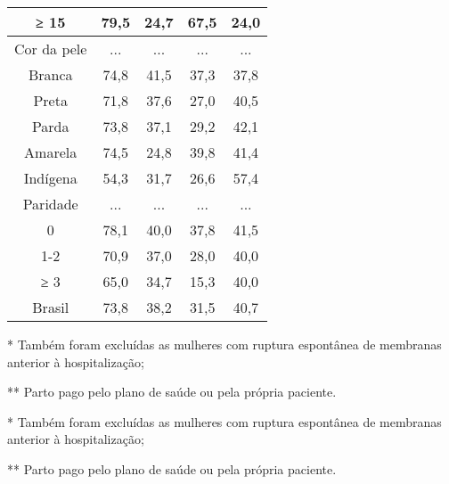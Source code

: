 \documentclass{article}
\begin{document}
\begin{table}
\begin{tabulary}{\linewidth}{ C C C C C }
≥ 15
& 79,5
& 24,7
& 67,5
& 24,0
\\ \hline

Cor da pele
& ...
& ...
& ...
& ...
\\ \hline

Branca
& 74,8
& 41,5
& 37,3
& 37,8
\\ \hline

Preta
& 71,8
& 37,6
& 27,0
& 40,5
\\ \hline

Parda
& 73,8
& 37,1
& 29,2
& 42,1
\\ \hline

Amarela
& 74,5
& 24,8
& 39,8
& 41,4
\\ \hline

Indígena
& 54,3
& 31,7
& 26,6
& 57,4
\\ \hline

Paridade
& ...
& ...
& ...
& ...
\\ \hline

0
& 78,1
& 40,0
& 37,8
& 41,5
\\ \hline

1-2
& 70,9
& 37,0
& 28,0
& 40,0
\\ \hline

≥ 3
& 65,0
& 34,7
& 15,3
& 40,0
\\ \hline

Brasil
& 73,8
& 38,2
& 31,5
& 40,7
\\ \hline

\end{tabulary}
\caption*{\footnotesize }
\caption{}
\end{table}

* Também foram excluídas as mulheres com ruptura espontânea de
membranas anterior à hospitalização;

** Parto pago pelo plano de saúde ou pela própria paciente.

* Também foram excluídas as mulheres com ruptura espontânea de
membranas anterior à hospitalização;

** Parto pago pelo plano de saúde ou pela própria paciente.
\end{document}

